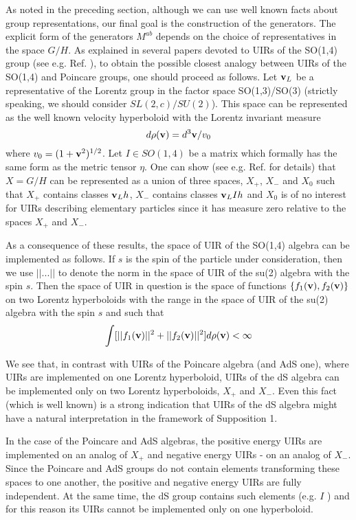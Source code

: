 \documentclass[a4paper,12pt]{article}%
\begin{document}
As noted in the preceding section, although we
can use well known facts about group representations,
our final goal is the construction of the
generators. The explicit form of the generators $M^{ab}$
depends on the choice of representatives in
the space $G/H$. As explained in several
papers devoted to UIRs of the SO(1,4) group
(see e.g. Ref. \cite{Men}), to obtain
the  possible closest analogy between UIRs of
the SO(1,4) and Poincare groups, one should proceed
as follows. Let ${\bf v}_L$ be a representative 
of the Lorentz group in the factor space SO(1,3)/SO(3)
(strictly speaking, we should consider $SL(2,c)/SU(2)$).
This space can be represented as the well known velocity
hyperboloid with the Lorentz invariant measure
\begin{equation}
d\rho({\bf v})=d^3{\bf v}/v_0
\label{7}
\end{equation}
where $v_0=(1+{\bf v}^2)^{1/2}$. Let $I\in SO(1,4)$ be a
matrix which formally has the same form as
the metric tensor $\eta$. One can show 
(see e.g. Ref. \cite{Men} for details) that 
$X=G/H$ can be represented as a union of three
spaces, $X_+$, $X_-$ and $X_0$ such that 
$X_+$ contains classes ${\bf v}_Lh$, $X_-$
contains classes ${\bf v}_LIh$ and $X_0$ is of
no interest for UIRs describing elementary particles 
since it has measure zero relative to the spaces
$X_+$ and $X_-$.

As a consequence of these results, the space of UIR
of the SO(1,4) algebra can be implemented as follows.  
If $s$ is the spin of the particle under 
consideration, then we
use $||...||$ to denote the norm in the space of 
UIR of the su(2) algebra with the spin $s$. 
Then the space of UIR in question is the space of 
functions $\{f_1({\bf v}),f_2({\bf v})\}$ on
two Lorentz hyperboloids with the range in the space of
UIR of the su(2) algebra with the spin $s$ and such that
\begin{equation}
\int\nolimits [||f_1({\bf v})||^2+
||f_2({\bf v})||^2]d\rho({\bf v}) <\infty
\label{8}
\end{equation}

We see that, in contrast with UIRs of the Poincare 
algebra (and AdS one), where UIRs are implemented on
one Lorentz hyperboloid, UIRs of the dS algebra can be
implemented only on two Lorentz hyperboloids, $X_+$
and $X_-$. Even this
fact (which is well known) is a strong indication 
that UIRs of the dS algebra might
have a natural interpretation in the framework of
Supposition 1.

In the case of the Poincare and AdS algebras, the positive
energy UIRs are implemented on an analog of $X_+$ and 
negative energy UIRs - on an analog of $X_-$. Since the 
Poincare and AdS groups
do not contain elements transforming these spaces
to one another, the positive and negative energy UIRs 
are fully independent. At the same time, the dS 
group contains 
such elements (e.g. $I$ \cite{Men,Dobrev,Mielke}) and for 
this reason its UIRs cannot be implemented only on 
one hyperboloid. 
\end{document}
